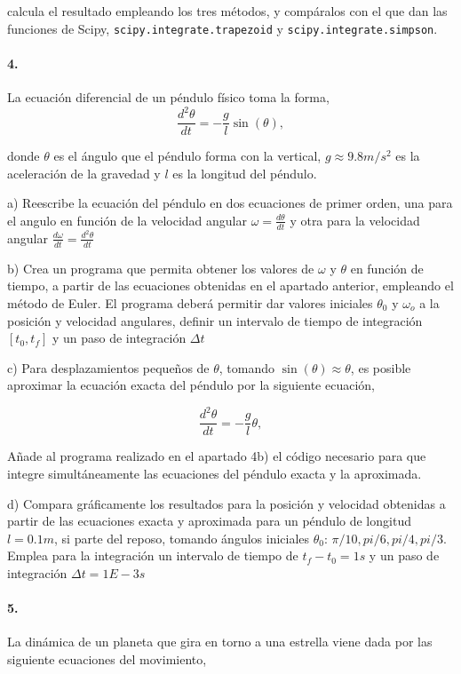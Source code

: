 \noindent calcula el resultado empleando los tres métodos, y compáralos con el que dan las funciones de Scipy,  \texttt{scipy.integrate.trapezoid} y \texttt{scipy.integrate.simpson}.

\paragraph{4.} La ecuación diferencial de un péndulo físico toma la forma,
\begin{equation*}
\frac{d^2\theta}{dt} =-\frac{g}{l}\sin(\theta),
\end{equation*}

donde $\theta$ es el ángulo que el péndulo forma con la vertical, $g\approx9.8 m/s^2$ es la aceleración de la gravedad y $l$ es la longitud del péndulo.

a) Reescribe la ecuación del péndulo en dos ecuaciones de primer orden, una para el angulo en función de la velocidad angular $\omega = \frac{d\theta}{dt}$ y otra para la velocidad angular $\frac{d\omega}{dt} = \frac{d^2\theta}{dt}$

b) Crea un programa que permita obtener los valores de $\omega$ y $\theta$ en función de tiempo, a partir de las ecuaciones obtenidas en el apartado anterior, empleando el método de Euler. El programa deberá permitir dar valores iniciales $\theta_0$ y $\omega_o$ a la posición y velocidad angulares, definir un intervalo de tiempo de integración $[t_0,t_f]$ y un paso de integración $\Delta t$

c) Para desplazamientos  pequeños de $\theta$, tomando $\sin(\theta) \approx \theta$, es posible aproximar  la ecuación exacta del péndulo por la siguiente ecuación,

\begin{equation*}
\frac{d^2\theta}{dt} =-\frac{g}{l}\theta,
\end{equation*}

\noindent Añade al programa realizado en el apartado 4b) el código necesario para que integre simultáneamente las ecuaciones del péndulo exacta y la aproximada.

d) Compara gráficamente los resultados para la posición y velocidad obtenidas a partir de las ecuaciones exacta y aproximada para un péndulo de longitud $l=0.1m$, si parte del reposo, tomando ángulos iniciales $\theta_0$: $\pi/10, pi/6, pi/4, pi/3$. Emplea para la integración un intervalo de tiempo de $t_f-t_0 = 1s$ y un paso de integración $\Delta t=1E-3s$

\paragraph{5.} La dinámica de un planeta que gira en torno a una estrella viene dada por las siguiente ecuaciones del movimiento,

